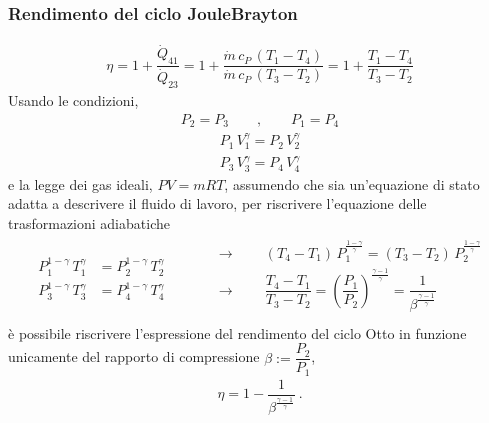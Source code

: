 \documentclass[letterpaper,10pt,italian]{jupyterBook}
\begin{document}
\subsubsection{Rendimento del ciclo Joule\sphinxhyphen{}Brayton}
\label{\detokenize{ch/thermodynamics/heat-engine-joule-brayton:rendimento-del-ciclo-joule-brayton}}\begin{equation*}
\begin{split}\eta = 1 + \dfrac{\dot{Q}_{41}}{\dot{Q}_{23}}
       = 1 + \dfrac{\dot{m} \, c_P \, (T_1 - T_4)}{\dot{m} \, c_P \, (T_3 - T_2)}
       = 1 + \dfrac{T_1 - T_4}{T_3 - T_2}
\end{split}
\end{equation*}
\sphinxAtStartPar
Usando le condizioni,  
\begin{equation*}
\begin{split}P_2 = P_3 \qquad , \qquad P_1 = P_4\end{split}
\end{equation*}\begin{equation*}
\begin{split}P_1 \, V_1^{\gamma} = P_2 \, V_2^{\gamma}\end{split}
\end{equation*}\begin{equation*}
\begin{split}P_3 \, V_3^{\gamma} = P_4 \, V_4^{\gamma}\end{split}
\end{equation*}
\sphinxAtStartPar
e la legge dei gas ideali, \(P V = m R T\), assumendo che sia un’equazione di stato adatta a descrivere il fluido di lavoro, per riscrivere l’equazione delle trasformazioni adiabatiche
\begin{equation*}
\begin{split}\begin{aligned}
  P_1^{1-\gamma} \, T_1^{\gamma} & = P_2^{1-\gamma} \, T_2^{\gamma} \\
  P_3^{1-\gamma} \, T_3^{\gamma} & = P_4^{1-\gamma} \, T_4^{\gamma}
\end{aligned}
\begin{aligned}
  & \qquad \rightarrow \qquad  (T_4 - T_1) \, P_1^{\frac{1-\gamma}{\gamma}} = (T_3 - T_2) \, P_2^{\frac{1-\gamma}{\gamma}} \\
  & \qquad \rightarrow \qquad  \dfrac{T_4 - T_1}{T_3 - T_2} = \left( \dfrac{P_1}{P_2} \right)^{\frac{\gamma-1}{\gamma}} = \dfrac{1}{\beta^{\frac{\gamma - 1}{\gamma}}} \\
\end{aligned}
\end{split}
\end{equation*}
\sphinxAtStartPar
è possibile riscrivere l’espressione del rendimento del ciclo Otto in funzione unicamente del rapporto di compressione \(\beta := \dfrac{P_2}{P_1}\),
\begin{equation*}
\begin{split}\eta = 1 - \dfrac{1}{\beta^{\frac{\gamma-1}{\gamma}}} \ .\end{split}
\end{equation*}
\end{document}
